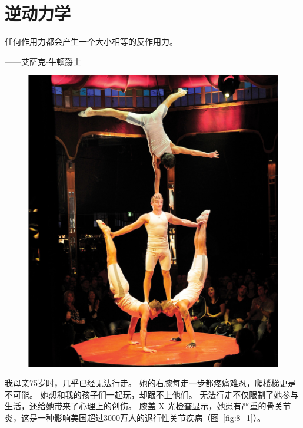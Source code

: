 \chapter{逆动力学} \label{chap:chap8}

任何作用力都会产生一个大小相等的反作用力。

\begin{flushright}
	——艾萨克$\cdot$牛顿爵士
\end{flushright}

\begin{figure}[!htb]
	\centering
	\includegraphics[width=1.0\linewidth]{chap8/8_0}
	\caption*{ \label{fig:8_0}}
\end{figure}


我母亲75岁时，几乎已经无法行走。
她的右膝每走一步都疼痛难忍，爬楼梯更是不可能。
她想和我的孩子们一起玩，却跟不上他们。
无法行走不仅限制了她参与生活，还给她带来了心理上的创伤。
膝盖 X 光检查显示，她患有严重的骨关​​节炎，这是一种影响美国超过3000万人的退行性关节疾病（图~\ref{fig:8_1}）。


